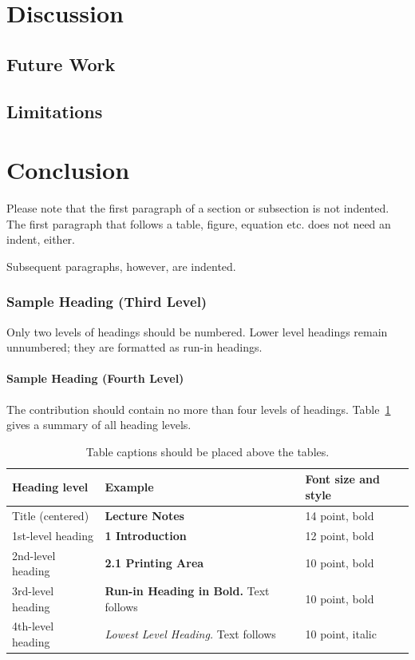 \documentclass[runningheads]{llncs}
\begin{document}
\section{Discussion} %
\subsection{Future Work}
\subsection{Limitations}
\section{Conclusion} %
Please note that the first paragraph of a section or subsection is
not indented. The first paragraph that follows a table, figure,
equation etc. does not need an indent, either.

Subsequent paragraphs, however, are indented.

\subsubsection{Sample Heading (Third Level)} Only two levels of
headings should be numbered. Lower level headings remain unnumbered;
they are formatted as run-in headings.

\paragraph{Sample Heading (Fourth Level)}
The contribution should contain no more than four levels of
headings. Table~\ref{tab1} gives a summary of all heading levels.

\begin{table}
\caption{Table captions should be placed above the
tables.}\label{tab1}
\begin{tabular}{|l|l|l|}
\hline
Heading level &  Example & Font size and style\\
\hline
Title (centered) &  {\Large\bfseries Lecture Notes} & 14 point, bold\\
1st-level heading &  {\large\bfseries 1 Introduction} & 12 point, bold\\
2nd-level heading & {\bfseries 2.1 Printing Area} & 10 point, bold\\
3rd-level heading & {\bfseries Run-in Heading in Bold.} Text follows & 10 point, bold\\
4th-level heading & {\itshape Lowest Level Heading.} Text follows & 10 point, italic\\
\hline
\end{tabular}
\end{table}
\end{document}
